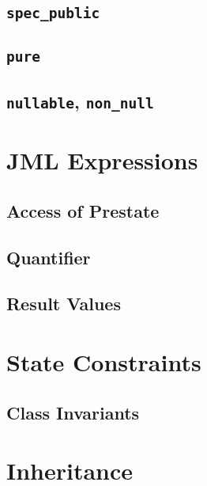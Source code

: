 \documentclass[a4paper, 11pt, accentcolor = tud3b]{tudreport}
\begin{document}
			\subsection{\texttt{spec\_public}} %

			\subsection{\texttt{pure}} %

			\subsection{\texttt{nullable}, \texttt{non\_null}} %

		\section{JML Expressions} %

			\subsection{Access of Prestate} %

			\subsection{Quantifier} %

			\subsection{Result Values} %

		\section{State Constraints} %

			\subsection{Class Invariants} %

		\section{Inheritance} %
\end{document}
